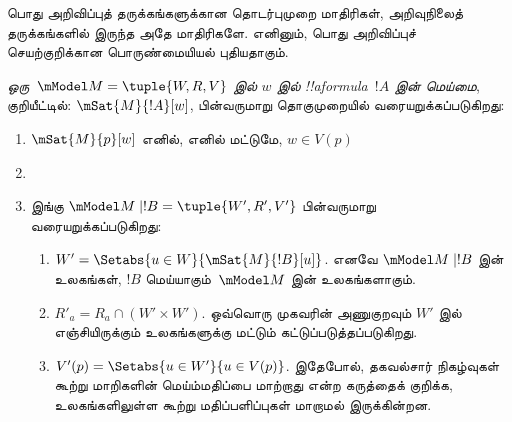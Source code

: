 \documentclass[../../../include/open-logic-section]{subfiles}
\begin{document}


பொது அறிவிப்புத் தருக்கங்களுக்கான தொடர்புமுறை மாதிரிகள், அறிவுநிலைத்
தருக்கங்களில் இருந்த அதே மாதிரிகளே. எனினும், பொது அறிவிப்புச்
செயற்குறிக்கான பொருண்மையியல் புதியதாகும்.

\begin{defn} \emph{ஒரு~$\mModel M = \tuple{W, R, V}$
  இல் $w$ இல் !!a{formula}~$!A$ இன் மெய்மை}, குறியீட்டில்:
  $\mSat{M}{!A}[w]$, பின்வருமாறு தொகுமுறையில் வரையறுக்கப்படுகிறது:
  \begin{enumerate}
  \item $\mSat{M}{p}[w]$ எனில், எனில் மட்டுமே, $w \in V(p)$
  \item{}
  \item{}


  இங்கு $\mModel M \mid !B = \tuple{W', R', V'}$ பின்வருமாறு
  வரையறுக்கப்படுகிறது:
  \begin{enumerate}
    \item $W' = \Setabs{ u \in W}{\mSat{M}{!B}[u]}$. எனவே
      $\mModel M \mid !B$ இன் உலகங்கள், $!B$ மெய்யாகும்~$\mModel M$ இன்
      உலகங்களாகும்.
    \item $R'_a = R_a \cap (W' \times W')$. ஒவ்வொரு முகவரின் அணுகுறவும்
      $W'$ இல் எஞ்சியிருக்கும் உலகங்களுக்கு மட்டும் கட்டுப்படுத்தப்படுகிறது.
    \item $V'(p) = \Setabs{ u \in W'}{u \in V(p) }$. இதேபோல்,
      தகவல்சார் நிகழ்வுகள் கூற்று மாறிகளின் மெய்ம்மதிப்பை மாற்றாது என்ற
      கருத்தைக் குறிக்க, உலகங்களிலுள்ள கூற்று மதிப்பளிப்புகள் மாறாமல்
      இருக்கின்றன.
  \end{enumerate}

  \end{enumerate}
\end{defn}
\end{document}
